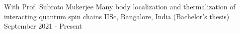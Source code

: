 

\begin{cventries}


\cventry
{With Prof. Subroto Mukerjee} %
{Many body localization and thermalization of interacting quantum spin chains} %
{IISc, Bangalore, India \space \space\space\space\space\space\space\space\space\space\space(Bachelor's thesis)} %
{September 2021 - Present} %
{
	\begin{cvitems} %
	\end{cvitems}
}

\end{cventries}

